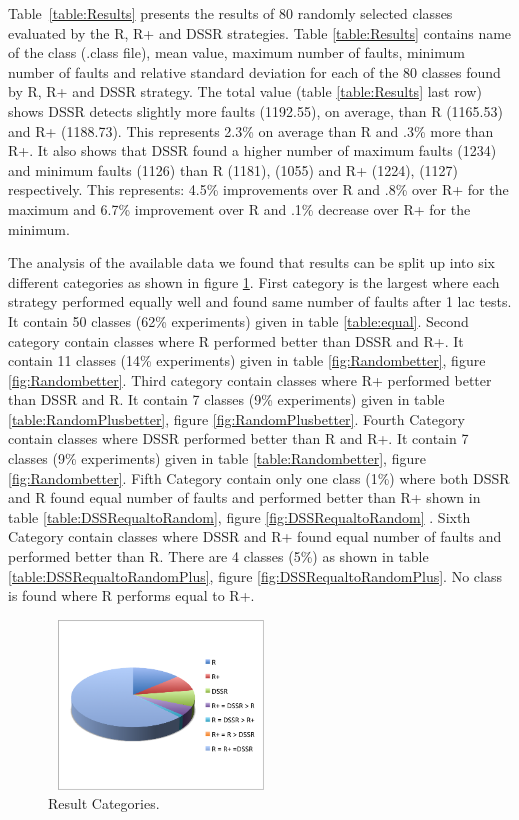 \documentclass[conference]{IEEEtran}
\begin{document}
Table~\ref{table:Results} presents the results of 80 randomly selected classes evaluated by the R, R+ and DSSR strategies. Table \ref{table:Results} contains name of the class (.class file), mean value, maximum number of faults, minimum number of faults and relative standard deviation for each of the 80 classes found by R, R+ and DSSR strategy. The total value (table \ref{table:Results} last row) shows DSSR detects slightly more faults (1192.55), on average, than R (1165.53) and R+ (1188.73). This represents 2.3\% on average than R and .3\% more than R+. It also shows that DSSR found a higher number of maximum faults (1234) and minimum faults (1126) than R (1181), (1055) and R+ (1224), (1127) respectively. This represents: 4.5\% improvements over R and .8\% over R+ for the maximum and 6.7\% improvement over R and .1\% decrease over R+ for the minimum. 

The analysis of the available data we found that results can be split up into six different categories as shown in figure \ref{fig:pie}. First category is the largest where each strategy performed equally well and found same number of faults after 1 lac tests. It contain 50 classes (62\% experiments) given in table \ref{table:equal}. Second category contain classes where R performed better than DSSR and R+. It contain 11 classes (14\% experiments) given in table \ref{fig:Randombetter}, figure \ref{fig:Randombetter}. Third category contain classes where R+ performed better than DSSR and R. It contain 7 classes (9\% experiments) given in table \ref{table:RandomPlusbetter}, figure \ref{fig:RandomPlusbetter}. Fourth Category contain classes where DSSR performed better than R and R+. It contain 7 classes (9\% experiments) given in table \ref{table:Randombetter}, figure \ref{fig:Randombetter}. Fifth Category contain only one class (1\%) where both DSSR and R found equal number of faults and performed better than R+ shown in table \ref{table:DSSRequaltoRandom}, figure \ref{fig:DSSRequaltoRandom} . Sixth Category contain classes where DSSR and R+ found equal number of faults and performed better than R. There are 4 classes (5\%) as shown in table \ref{table:DSSRequaltoRandomPlus}, figure \ref{fig:DSSRequaltoRandomPlus}. No class is found where R performs equal to R+.\\ 


\begin{figure}[ht]
\centering
\includegraphics[width=6cm,height=4.5cm]{pie1.png}
\caption{Result Categories.}
\label{fig:pie}
\end{figure}
\end{document}
